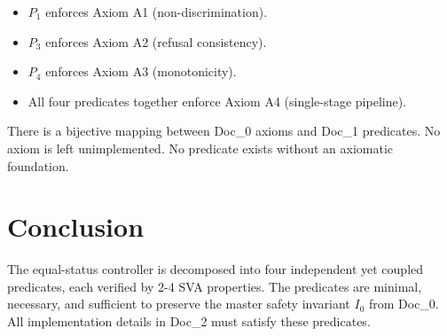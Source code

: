 \documentclass[11pt,oneside]{article}
\begin{document}
\begin{itemize}
\item $P_1$ enforces Axiom A1 (non-discrimination).
\item $P_3$ enforces Axiom A2 (refusal consistency).
\item $P_4$ enforces Axiom A3 (monotonicity).
\item All four predicates together enforce Axiom A4 (single-stage pipeline).
\end{itemize}

There is a bijective mapping between Doc\_0 axioms and Doc\_1 predicates. No axiom is left unimplemented. No predicate exists without an axiomatic foundation.

\section{Conclusion}

The equal-status controller is decomposed into four independent yet coupled predicates, each verified by 2-4 SVA properties. The predicates are minimal, necessary, and sufficient to preserve the master safety invariant $I_0$ from Doc\_0. All implementation details in Doc\_2 must satisfy these predicates.
\end{document}
